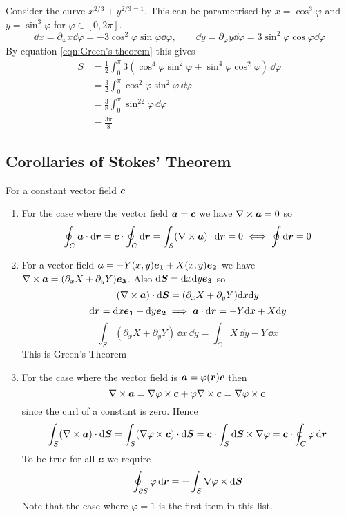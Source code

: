 \documentclass{article}
\begin{document}
    \example
    Consider the curve \(x^{2/3} + y^{2/3 = 1}\).
    This can be parametrised by \(x = \cos^3\varphi\) and \(y = \sin^3\varphi\) for \(\varphi\in[0, 2\pi]\).
    \[\dd x = \partial_\varphi x\dd\varphi = -3\cos^2\varphi\sin\varphi\dd\varphi,\qquad \dd y = \partial_\varphi y\dd\varphi = 3\sin^2\varphi\cos\varphi\dd\varphi\]
    By equation \ref{eqn:Green's theorem} this gives
    \begin{align*}
        S &= \frac{1}{2}\int_0^\pi 3(\cos^4\varphi\sin^2\varphi + \sin^4\varphi\cos^2\varphi)\,\dd\varphi\\
        &= \frac{3}{2}\int_0^\pi \cos^2\varphi\sin^2\varphi\,\dd\varphi\\
        &= \frac{3}{8}\int_0^\pi \sin^22\varphi\,\dd\varphi\\
        &= \frac{3\pi}{8}
    \end{align*}
    
    \subsection{Corollaries of Stokes' Theorem}
    For a constant vector field \(\bm{c}\)
    \begin{enumerate}
        \item For the case where the vector field \(\bm{a} = \bm{c}\) we have \(\nabla\times\bm{a} = 0\) so
        \[\oint_C\bm{a}\cdot\dd\bm{r} = \bm{c}\cdot\oint_C\dd\bm{r} = \int_S(\nabla\times\bm{a})\cdot\dd\bm{r} = 0 \iff \oint\dd\bm{r} = 0\]
        \item For a vector field \(\bm{a} = -Y(x, y)\bm{e_{1}} + X(x, y)\bm{e_{2}}\) we have \(\nabla\times\bm{a} = (\partial_x X + \partial_y Y)\bm{e_{3}}\).
        Also \(\dd\bm{S} = \dd x\dd y\bm{e_{3}}\) so
        \[(\nabla\times\bm{a})\cdot\dd\bm{S} = (\partial_x X + \partial_y Y)\dd x\dd y\]
        \[\dd\bm{r} = \dd x\bm{e_{1}} + \dd y\bm{e_{2}} \implies \bm{a}\cdot\dd\bm{r} = -Y\dd x + X\dd y\]
        \[\int_S(\partial_x X + \partial_y Y)\,\dd x\,\dd y = \int_C X\,\dd y - Y\,\dd x\]
        This is Green's Theorem
        \item For the case where the vector field is \(\bm{a} = \varphi(\bm{r})\bm{c}\) then
        \[\nabla\times\bm{a} = \nabla\varphi\times\bm{c} + \varphi\nabla\times\bm{c} = \nabla\varphi\times\bm{c}\]
        since the curl of a constant is zero.
        Hence
        \[\int_S(\nabla\times\bm{a})\cdot\dd\bm{S} = \int_S (\nabla\varphi\times\bm{c})\cdot\dd\bm{S} = \bm{c}\cdot\int_S\dd\bm{S}\times\nabla\varphi = \bm{c}\cdot\oint_C\varphi\,\dd\bm{r}\]
        To be true for all \(\bm{c}\) we require
        \[\oint_{\partial S} \varphi\,\dd\bm{r} = -\int_S\nabla\varphi\times\dd\bm{S}\]
        Note that the case where \(\varphi = 1\) is the first item in this list.
    \end{enumerate}
    
\end{document}
